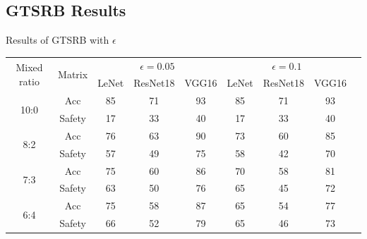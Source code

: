 \documentclass[journal,article,submit,moreauthors,pdftex]{Definitions/mdpi}
\begin{document}
\subsection{GTSRB Results}

\begin{specialtable}[H]
    \centering
    \caption{Results of GTSRB with \begin{math}\epsilon\end{math}}
    \label{gtsrb-results}
    {\small
    \begin{tabular}{|c|c|c|c|c|c|c|c|c|}
    \hline
    \multirow{2}{*}{Mixed ratio} & \multirow{2}{*}{Matrix} & \multicolumn{3}{c|}{\begin{math}\epsilon=0.05\end{math}}  & \multicolumn{3}{c|}{\begin{math}\epsilon=0.1\end{math}}       \\ \cline{3-8}
                                 &                           & LeNet               & ResNet18              & VGG16       & LeNet              & ResNet18              & VGG16              \\ \hline 
    \multirow{2}{*}{10:0}        & Acc                       & 85                  & 71                    & 93          & 85                 & 71                    & 93                 \\ \cline{2-8} 
                                 & Safety                    & 17                  & 33                    & 40          & 17                 & 33                    & 40                 \\ \hline 
    \multirow{2}{*}{8:2}         & Acc                       & 76                  & 63                    & 90          & 73                 & 60                    & 85                 \\ \cline{2-8} 
                                 & Safety                    & 57                  & 49                    & 75          & 58                 & 42                    & 70                 \\ \hline 
    \multirow{2}{*}{7:3}         & Acc                       & 75                  & 60                    & 86          & 70                 & 58                    & 81                 \\ \cline{2-8} 
                                 & Safety                    & 63                  & 50                    & 76          & 65                 & 45                    & 72                 \\ \hline 
    \multirow{2}{*}{6:4}         & Acc                       & 75                  & 58                    & 87          & 65                 & 54                    & 77                 \\ \cline{2-8} 
                                 & Safety                    & 66                  & 52                    & 79          & 65                 & 46                    & 73                 \\ \hline 
    \end{tabular}
    }
\end{specialtable}
\end{document}

